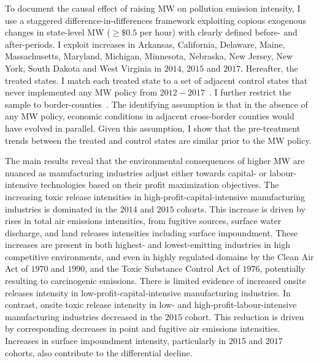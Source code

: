 \documentclass[12pt, english]{article}
\begin{document}
    To document the causal effect of raising MW on pollution emission intensity, I use a staggered difference-in-differences framework exploiting copious exogenous changes in state-level MW ($\geq \$0.5$ per hour) with clearly defined before- and after-periods. I exploit increases in Arkansas, California, Delaware, Maine, Massachusetts, Maryland, Michigan, Minnesota, Nebraska, New Jersey, New York, South Dakota and West Virginia in $2014$, $2015$ and $2017$. Hereafter, the treated states. I match each treated state to a set of adjacent control states that never implemented any MW policy from $2012-2017$~\parencite{gopalan2021state}. I further restrict the sample to border-counties~\parencite{dube2010minimum}. The identifying assumption is that in the absence of any MW policy, economic conditions in adjacent cross-border counties would have evolved in parallel. Given this assumption, I show that the pre-treatment trends between the treated and control states are similar prior to the MW policy.

    The main results reveal that the environmental consequences of higher MW are nuanced as manufacturing industries adjust either towards capital- or labour-intensive technologies based on their profit maximization objectives. The increasing toxic release intensities in high-profit-capital-intensive manufacturing industries is dominated in the $2014$ and $2015$ cohorts. This increase is driven by rises in total air emissions intensities, from fugitive sources, surface water discharge, and land releases intensities including surface impoundment. These increases are present in both highest- and lowest-emitting industries in high competitive environments, and even in highly regulated domains by the Clean Air Act of $1970$ and $1990$, and the Toxic Substance Control Act of $1976$, potentially resulting to carcinogenic emissions. There is limited evidence of increased onsite releases intensity in low-profit-capital-intensive manufacturing industries. In contrast, onsite toxic release intensity in low- and high-profit-labour-intensive manufacturing industries decreased in the $2015$ cohort. This reduction is driven by corresponding decreases in point and fugitive air emissions intensities. Increases in surface impoundment intensity, particularly in $2015$ and $2017$ cohorts, also contribute to the differential decline.
\end{document}
